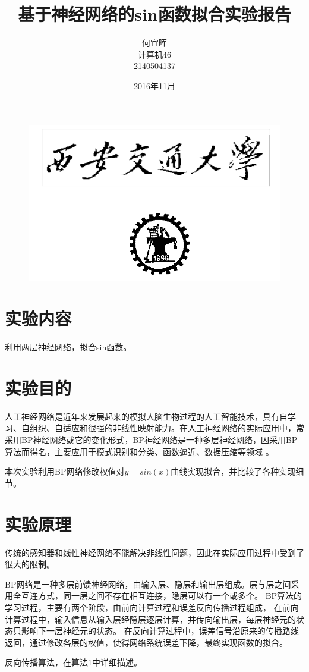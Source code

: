 \documentclass{article}
\date{2016年11月}
\title{基于神经网络的sin函数拟合实验报告}
\author{何宜晖\\计算机46\\2140504137}
\begin{document}
\begin{CJK}{UTF8}{gkai}
\begin{figure}
\centering
\includegraphics[width=0.6\linewidth]{xjtu}
\end{figure}


\maketitle
\clearpage
\section{实验内容}
利用两层神经网络，拟合sin函数。
\section{实验目的}
人工神经网络是近年来发展起来的模拟人脑生物过程的人工智能技术，具有自学习、自组织、自适应和很强的非线性映射能力。在人工神经网络的实际应用中，常采用BP神经网络或它的变化形式，BP神经网络是一种多层神经网络，因采用BP算法而得名，主要应用于模式识别和分类、函数逼近、数据压缩等领域 \cite{bao2010} 。  

本次实验利用BP网络修改权值对$y=sin(x)$曲线实现拟合，并比较了各种实现细节。

\section{实验原理}
传统的感知器和线性神经网络不能解决非线性问题，因此在实际应用过程中受到了很大的限制。

BP网络是一种多层前馈神经网络，由输入层、隐层和输出层组成。层与层之间采用全互连方式，同一层之间不存在相互连接，隐层可以有一个或多个。
BP算法的学习过程，主要有两个阶段，由前向计算过程和误差反向传播过程组成，
在前向计算过程中，输入信息从输入层经隐层逐层计算，并传向输出层，每层神经元的状态只影响下一层神经元的状态。
在反向计算过程中，误差信号沿原来的传播路线返回，通过修改各层的权值，使得网络系统误差下降，最终实现函数的拟合。

反向传播算法，在算法1中详细描述。


\end{CJK}
\end{document}
